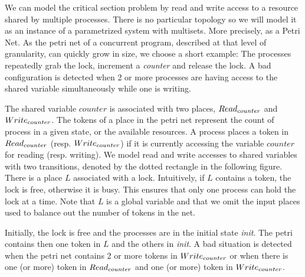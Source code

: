 \begin{wrapfigure}{r}[2pt]{0.6\textwidth}
\begin{center}
\end{center}
\vspace{-10mm}
\end{wrapfigure}
%
We can model the critical section problem by read and write access to
a resource shared by multiple processes. There is no particular
topology so we will model it as an instance of a parametrized system
with multisets. More precisely, as a Petri Net.
%
As the petri net of a concurrent program, described at that level of
granularity, can quickly grow in size, we choose a short example: The
processes repeatedly grab the lock, increment a \emph{counter} and
release the lock. A bad configuration is detected when 2 or more
processes are having access to the shared variable simultaneously
while one is writing. 

The shared variable $counter$ is associated with two places,
$Read_{counter}$ and $Write_{counter}$. The tokens of a place in the petri
net represent the count of process in a given state, or the available
resources. %
A process places a token in $Read_{counter}$ (resp. $Write_{counter}$) if
it is currently accessing the variable $counter$ for reading
(resp. writing). We model read and write accesses to shared variables
with two transitions, denoted by the dotted rectangle in the following
figure.
%
There is a place $L$ associated with a lock. Intuitively, if $L$
contains a token, the lock is free, otherwise it is busy. This ensures
that only one process can hold the lock at a time. 
%
Note that $L$ is a global variable and that we omit the input places
used to balance out the number of tokens in the net.
%

Initially, the lock is free and the processes are in the initial state
\emph{init}. The petri contains then one token in $L$ and the others
in \emph{init}. 
%
A bad situation is detected when the petri net contains 2 or more
tokens in $Write_{counter}$ or when there is one (or more) token in
$Read_{counter}$ and one (or more) token in $Write_{counter}$.
